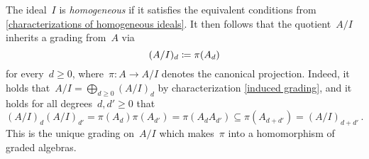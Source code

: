 \documentclass[a4paper,10pt,numbers = noenddot]{scrartcl}
\begin{document}
The ideal~$I$ is \emph{homogeneous} if it satisfies the equivalent conditions from \cref{characterizations of homogeneous ideals}.
It then follows that the quotient~$A/I$ inherits a grading from~$A$ via
\[
            (A/I)_d
  \coloneqq  \pi(A_d)
\]
for every~$d \geq 0$, where~$\pi \colon A \to A/I$ denotes the canonical projection.
Indeed, it holds that~$A/I = \bigoplus_{d \geq 0} (A/I)_d$ by characterization \ref*{induced grading}, and it holds for all degrees~$d, d' \geq 0$ that
\[
            (A/I)_d (A/I)_{d'}
  =         \pi(A_d) \pi(A_{d'})
  =         \pi(A_d A_{d'})
  \subseteq \pi(A_{d+d'})
  =         (A/I)_{d+d'} \,.
\]
This is the unique grading on~$A/I$ which makes~$\pi$ into a homomorphism of graded algebras.


%       
\end{document}

